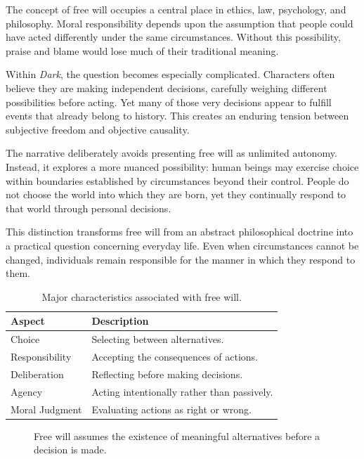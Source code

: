 \documentclass[12pt,oneside,openany]{book}
\begin{document}
The concept of free will occupies a central place in ethics, law, psychology,
and philosophy. Moral responsibility depends upon the assumption that people
could have acted differently under the same circumstances. Without this
possibility, praise and blame would lose much of their traditional meaning.

Within \textit{Dark}, the question becomes especially complicated. Characters
often believe they are making independent decisions, carefully weighing
different possibilities before acting. Yet many of those very decisions appear
to fulfill events that already belong to history. This creates an enduring
tension between subjective freedom and objective causality.

The narrative deliberately avoids presenting free will as unlimited autonomy.
Instead, it explores a more nuanced possibility: human beings may exercise
choice within boundaries established by circumstances beyond their control.
People do not choose the world into which they are born, yet they continually
respond to that world through personal decisions.

This distinction transforms free will from an abstract philosophical doctrine
into a practical question concerning everyday life. Even when circumstances
cannot be changed, individuals remain responsible for the manner in which they
respond to them.

\begin{table}[H]
\centering
\begin{tabular}{|p{4.3cm}|p{7.7cm}|}
\hline
\textbf{Aspect} & \textbf{Description}\\
\hline
Choice & Selecting between alternatives.\\
\hline
Responsibility & Accepting the consequences of actions.\\
\hline
Deliberation & Reflecting before making decisions.\\
\hline
Agency & Acting intentionally rather than passively.\\
\hline
Moral Judgment & Evaluating actions as right or wrong.\\
\hline
\end{tabular}
\caption{Major characteristics associated with free will.}
\end{table}

\begin{figure}[H]
\centering
{}

\caption{Free will assumes the existence of meaningful alternatives before a decision is made.}
\end{figure}
\end{document}
